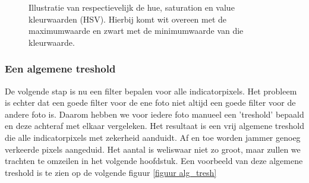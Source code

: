 \documentclass[a4paper,kulak]{kulakarticle}
\begin{document}
	\begin{figure}[H]
	\centering
	\qquad
	\qquad
	
	\caption{Illustratie van respectievelijk de hue, saturation en value kleurwaarden (HSV). Hierbij komt wit overeen met de maximumwaarde en zwart met de minimumwaarde van die kleurwaarde.}
	\label{figuur HSV}
	\end{figure}

	\subsubsection{Een algemene treshold}
		De volgende stap is nu een filter bepalen voor alle indicatorpixels. Het probleem is echter dat een goede filter voor de ene foto niet altijd een goede filter voor de andere foto is. Daarom hebben we voor iedere foto manueel een 'treshold' bepaald en deze achteraf met elkaar vergeleken. Het resultaat is een vrij algemene treshold die alle indicatorpixels met zekerheid aanduidt. Af en toe worden jammer genoeg verkeerde pixels aangeduid. Het aantal is weliswaar niet zo groot, maar zullen we trachten te omzeilen in het volgende hoofdstuk. Een voorbeeld van deze algemene treshold is te zien op de volgende figuur \ref{figuur alg_tresh}
\end{document}
